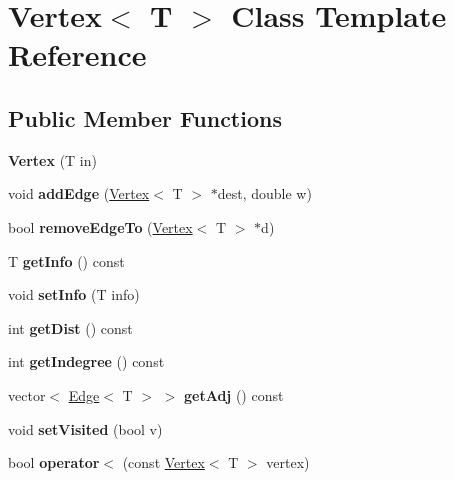 \hypertarget{class_vertex}{}\section{Vertex$<$ T $>$ Class Template Reference}
\label{class_vertex}
\subsection*{Public Member Functions}
\begin{DoxyCompactItemize}
\item 
{\bfseries Vertex} (T in)\hypertarget{class_vertex_afcbdd4d4198b672356559cb8fa088408}{}\label{class_vertex_afcbdd4d4198b672356559cb8fa088408}

\item 
void {\bfseries add\+Edge} (\hyperlink{class_vertex}{Vertex}$<$ T $>$ $\ast$dest, double w)\hypertarget{class_vertex_aeb024eced2da142912f189af6a454db3}{}\label{class_vertex_aeb024eced2da142912f189af6a454db3}

\item 
bool {\bfseries remove\+Edge\+To} (\hyperlink{class_vertex}{Vertex}$<$ T $>$ $\ast$d)\hypertarget{class_vertex_ab2b5b43fb1709a901b78718436763a84}{}\label{class_vertex_ab2b5b43fb1709a901b78718436763a84}

\item 
T {\bfseries get\+Info} () const \hypertarget{class_vertex_a5880b4b252ae6818819c2f9645784b59}{}\label{class_vertex_a5880b4b252ae6818819c2f9645784b59}

\item 
void {\bfseries set\+Info} (T info)\hypertarget{class_vertex_a31cd60c26640f8072a928ba70eb2f95e}{}\label{class_vertex_a31cd60c26640f8072a928ba70eb2f95e}

\item 
int {\bfseries get\+Dist} () const \hypertarget{class_vertex_a3379c6cbcf1eaacc098381e3557a0b52}{}\label{class_vertex_a3379c6cbcf1eaacc098381e3557a0b52}

\item 
int {\bfseries get\+Indegree} () const \hypertarget{class_vertex_a305ef01582f945f22134abb9294fe1f3}{}\label{class_vertex_a305ef01582f945f22134abb9294fe1f3}

\item 
vector$<$ \hyperlink{class_edge}{Edge}$<$ T $>$ $>$ {\bfseries get\+Adj} () const \hypertarget{class_vertex_a4626a25e4d263823ebffacfbc78949fb}{}\label{class_vertex_a4626a25e4d263823ebffacfbc78949fb}

\item 
void {\bfseries set\+Visited} (bool v)\hypertarget{class_vertex_aa1a1921cded8cb209382407b5a9433f3}{}\label{class_vertex_aa1a1921cded8cb209382407b5a9433f3}

\item 
bool {\bfseries operator$<$} (const \hyperlink{class_vertex}{Vertex}$<$ T $>$ vertex)\hypertarget{class_vertex_a7091b26f281a5041b1775a3d3f9cb7a6}{}\label{class_vertex_a7091b26f281a5041b1775a3d3f9cb7a6}

\end{DoxyCompactItemize}
